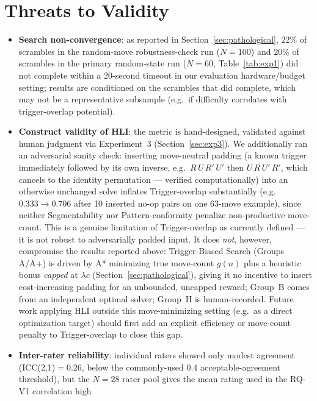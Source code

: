 \documentclass[10pt,conference]{article}
\begin{document}
\section{Threats to Validity}
\label{sec:threats}
\begin{itemize}
  \item \textbf{Search non-convergence}: as reported in
    Section~\ref{sec:pathological}, $22\%$ of scrambles in the
    random-move robustness-check run ($N=100$) and $20\%$ of
    scrambles in the primary random-state run ($N=60$,
    Table~\ref{tab:exp1}) did not complete within a 20-second timeout
    in our evaluation hardware/budget setting; results are
    conditioned on the scrambles that did complete, which may not be
    a representative subsample (e.g.\ if difficulty correlates with
    trigger-overlap potential).
  \item \textbf{Construct validity of HLI}: the metric is
    hand-designed, validated against human judgment via
    Experiment~3 (Section~\ref{sec:exp3}). We additionally ran an
    adversarial sanity check: inserting move-neutral padding (a known
    trigger immediately followed by its own inverse, e.g.\
    $R\,U\,R'\,U'$ then $U\,R\,U'\,R'$, which cancels to the identity
    permutation --- verified computationally) into an otherwise
    unchanged solve inflates Trigger-overlap substantially (e.g.\
    $0.333 \to 0.706$ after 10 inserted no-op pairs on one $63$-move
    example), since neither Segmentability nor Pattern-conformity
    penalize non-productive move-count. This is a genuine limitation
    of Trigger-overlap as currently defined --- it is not robust to
    adversarially padded input. It does \emph{not}, however,
    compromise the results reported above: Trigger-Biased Search
    (Groups A/A+) is driven by A* minimizing true move-count $g(n)$
    plus a heuristic bonus \emph{capped} at $\lambda c$
    (Section~\ref{sec:pathological}), giving it no incentive to
    insert cost-increasing padding for an unbounded, uncapped reward;
    Group~B comes from an independent optimal solver; Group~H is
    human-recorded. Future work applying HLI outside this
    move-minimizing setting (e.g.\ as a direct optimization target)
    should first add an explicit efficiency or move-count penalty to
    Trigger-overlap to close this gap.
  \item \textbf{Inter-rater reliability}: individual raters showed
    only modest agreement (ICC(2,1)$=0.26$, below the commonly-used
    $0.4$ acceptable-agreement threshold), but the $N=28$ rater pool
    gives the mean rating used in the RQ-V1 correlation high

\end{itemize}
\end{document}
